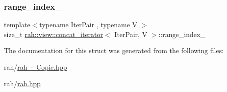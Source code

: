 \mbox{\label{structrah_1_1view_1_1concat__iterator_af57a6e3b1baf3641831378c7919e4256}} 
\subsubsection{\texorpdfstring{range\_index\_}{range\_index\_}}
{\footnotesize\ttfamily template$<$typename Iter\+Pair , typename V $>$ \\
size\+\_\+t \mbox{\hyperlink{structrah_1_1view_1_1concat__iterator}{rah\+::view\+::concat\+\_\+iterator}}$<$ Iter\+Pair, V $>$\+::range\+\_\+index\+\_\+}



The documentation for this struct was generated from the following files\+:\begin{DoxyCompactItemize}
\item 
rah/\mbox{\hyperlink{rah_01-_01_copie_8hpp}{rah -\/ Copie.\+hpp}}\item 
rah/\mbox{\hyperlink{rah_8hpp}{rah.\+hpp}}\end{DoxyCompactItemize}
